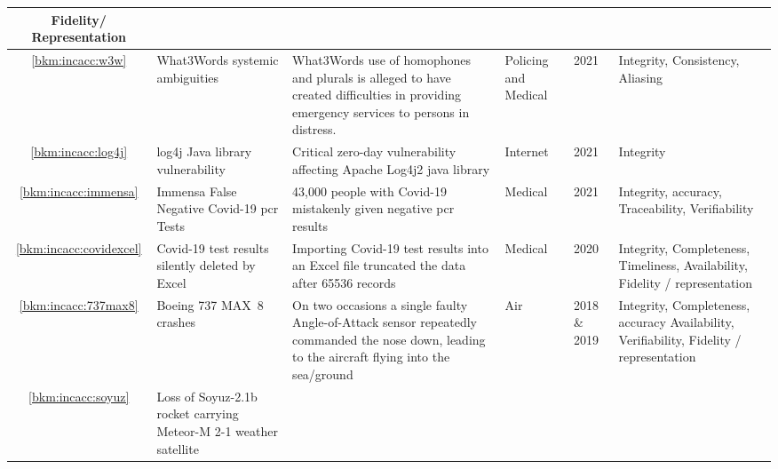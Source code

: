 \begin{longtable}{|C{}|L{}|L{}|L{}|L{}|L{}|}
  Fidelity/ Representation\\
  \hline
  \ref{bkm:incacc:w3w} & What3Words systemic ambiguities &
  What3Words use of homophones and plurals is alleged to have created difficulties in providing emergency services
  to persons in distress.
  &
  Policing and Medical & 2021 & Integrity,
  Consistency,
  Aliasing\\
  \hline
        \ref{bkm:incacc:log4j} & log4j Java library vulnerability &
        Critical zero-day vulnerability affecting Apache Log4j2 java library &
        Internet & 2021 & Integrity\\
        \hline
        \ref{bkm:incacc:immensa} & Immensa False Negative Covid-19 \gls{pcr} Tests &
        43,000 people with Covid-19 mistakenly given negative \gls{pcr} results &
        Medical & 2021 & Integrity, \gls{accuracy}, Traceability, Verifiability\\
        \hline
        \ref{bkm:incacc:covidexcel} & Covid-19 test results silently deleted by Excel &
        Importing Covid-19 test results into an Excel file truncated the data after 65536 records &
        Medical & 2020 & Integrity, Completeness, Timeliness, Availability, Fidelity / representation\\
        \hline
	\ref{bkm:incacc:737max8} & Boeing 737 MAX~8 crashes &
	On two occasions a single faulty Angle-of-Attack sensor repeatedly commanded the nose down,
        leading to the aircraft flying into the sea/ground
	& Air & 2018 \& 2019 & Integrity, Completeness, \gls{accuracy}\vspace{1ex} Availability, Verifiability, Fidelity / representation\\ 
	\hline
        \ref{bkm:incacc:soyuz} & Loss of Soyuz-2.1b rocket carrying Meteor-M 2-1 weather satellite &

\end{longtable}
